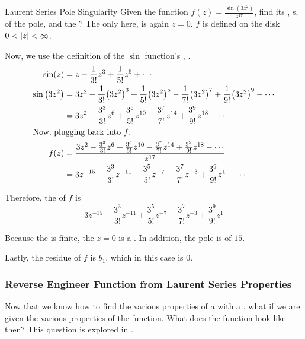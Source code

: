\begin{example}{Laurent Series Pole Singularity}
  Given the function $f(z) = \frac{\sin \left( 3 z^{2} \right)}{z^{17}}$, find its , s,  of the pole, and the ?
  \tcblower{}
  The only  here, is again $z=0$.
  $f$ is defined on the  disk $0 < \left\lvert z \right\rvert < \infty$.

  Now, we use the definition of the $\sin$ function's , .
  \begin{align*}
    \sin(z) &= z - \frac{1}{3!} z^{3} + \frac{1}{5!} z^{5} + \cdots \\
    \sin \left( 3z^{2} \right) &= 3z^{2} - \frac{1}{3!} { \left( 3z^{2} \right)}^{3} + \frac{1}{5!} {\left( 3z^{2} \right)}^{5} - \frac{1}{7!} { \left( 3z^{2} \right)}^{7} + \frac{1}{9!} { \left( 3z^{2} \right)}^{9} - \cdots \\
            &= 3z^{2} - \frac{3^{3}}{3!} z^{6} + \frac{3^{5}}{5!} z^{10} - \frac{3^{7}}{7!} z^{14} + \frac{3^{9}}{9!} z^{18} - \cdots \\
    \shortintertext{Now, plugging back into $f$.}
    f(z) &= \frac{3z^{2} - \frac{3^{3}}{3!} z^{6} + \frac{3^{5}}{5!} z^{10} - \frac{3^{7}}{7!} z^{14} + \frac{3^{9}}{9!} z^{18} - \cdots}{z^{17}} \\
            &= 3z^{-15} - \frac{3^{3}}{3!} z^{-11} + \frac{3^{5}}{5!} z^{-7} - \frac{3^{7}}{7!} z^{-3} + \frac{3^{9}}{9!} z^{1} - \cdots
  \end{align*}

  Therefore, the  of $f$ is
  \begin{equation*}
    3z^{-15} - \frac{3^{3}}{3!} z^{-11} + \frac{3^{5}}{5!} z^{-7} - \frac{3^{7}}{7!} z^{-3} + \frac{3^{9}}{9!} z^{1}
  \end{equation*}

  Because the  is finite, the  $z=0$ is a .
  In addition, the pole is of  $15$.

  Lastly, the residue of $f$ is
  $b_{1}$, which in this case is $0$.
\end{example}

\subsubsection{Reverse Engineer Function from Laurent Series Properties}\label{subsubsec:Reverse_Engineer_Function_from_Laurent_Series_Properties}
Now that we know how to find the various properties of a  with a , what if we are given the various properties of the function.
What does the function look like then?
This question is explored in .


